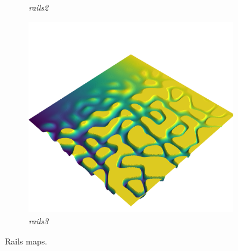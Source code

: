 \documentclass[../document.tex]{subfiles}
\begin{document}
\begin{figure}[H]
\begin{subfigure}[b]{0.32\linewidth}
            \caption{\emph{rails2}}
            \end{subfigure}    
          \begin{subfigure}[b]{0.32\textwidth}
            \includegraphics[width=\textwidth]{../img/hm3d/rails3.png}
            \caption{\emph{rails3}}
        \end{subfigure}    
    \label{fig: heightmaps}
    \caption{Rails maps.}
\end{figure}
\end{document}
